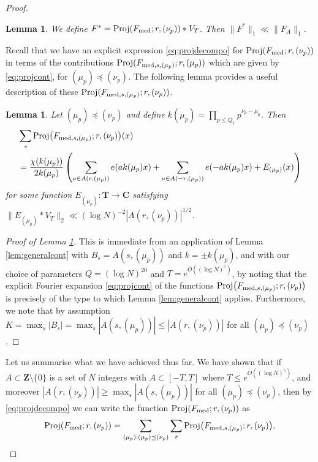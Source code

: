 \documentclass[11pt, reqno]{amsart}
\newtheorem{lemma}[theorem]{Lemma}
\DeclareMathOperator{\Proj}{Proj}
\begin{document}
\begin{proof}
\begin{lemma}\label{lem:dlVPconv}
    We define $F^*=\Proj(F_\textnormal{med};r,(\nu_p))*V_{T}$. Then $\lVert F^*\rVert_1\ll \lVert F_A\rVert_1$.
\end{lemma}
Recall that we have an explicit expression \eqref{eq:projdecompo} for $\Proj(F_\textnormal{med};r,(\nu_p))$ in terms of the contributions $\Proj(F_{\textnormal{med},s,(\mu_p)};r,(\mu_p))$ which are given by \eqref{eq:projcont}, for $(\mu_p)\preceq (\nu_p)$. The following lemma provides a useful description of these $\Proj(F_{\textnormal{med},s,(\mu_p)};r,(\nu_p))$.
\begin{lemma}\label{lem:allscont}
    Let $(\mu_p)\preceq (\nu_p)$ and define $k(\mu_p)=\prod_{p\leqslant Q_1}p^{\nu_p-\mu_p}$. Then
    \begin{align*}   &\sum_s\Proj\bigl(F_{\textnormal{med},s,(\mu_p)};r,(\nu_p)\bigr)(x)\\
    &=\frac{\chi(k(\mu_p))}{2k(\mu_p)}\left(\sum_{a\in A(r,(\mu_p))}e(ak(\mu_p)x) + \sum_{a\in A(-r,(\mu_p))}e(-ak(\mu_p)x) + E_{(\mu_p)}(x)\right)
    \end{align*}
        for some function $E_{(\mu_p)}:\mathbf{T}\to\mathbf{C}$ satisfying $\lVert E_{(\mu_p)}*V_{T}\rVert_2\ll (\log N)^{-2}|A(r,(\nu_p))|^{1/2}$.
\end{lemma}
\begin{proof}[Proof of Lemma \ref{lem:allscont}]
This is immediate from an application of Lemma \ref{lem:generalcont} with $B_s=A(s,(\mu_p))$ and $k=\pm k(\mu_p)$, and with our choice of parameters $Q=(\log N)^{20}$ and $T=e^{O((\log N)^5)}$, by noting that the explicit Fourier expansion \eqref{eq:projcont} of the functions $\Proj\bigl(F_{\textnormal{med},s,(\mu_p)};r,(\nu_p)\bigr)$ is precisely of the type to which Lemma \ref{lem:generalcont} applies. Furthermore, we note that by assumption $K=\max_s|B_s|=\max_s|A(s,(\mu_p))|\leqslant |A(r,(\nu_p))|$ for all $(\mu_p)\preceq (\nu_p)$.
\end{proof}
Let us summarise what we have achieved thus far. We have shown that if $A\subset \mathbf{Z}\setminus\{0\}$ is a set of $N$ integers with $A\subset [-T,T]$ where $T\leqslant e^{O((\log N)^5)}$, and moreover $|A(r,(\nu_p))|\geqslant \max_s|A(s,(\mu_p))|$ for all $(\mu_p)\preceq(\nu_p)$, then by \eqref{eq:projdecompo} we can write the function $\Proj(F_\textnormal{med};r,(\nu_p))$ as
\begin{align}\label{eq:fullF_m}
        \Proj(F_\textnormal{med};r,(\nu_p))=\sum_{(\mu_p):(\mu_p)\preceq(\nu_p)}\sum_s\Proj\bigl(F_{\textnormal{med},s,(\mu_p)};r,(\nu_p)\bigr),

\end{align}
\end{proof}
\end{document}
